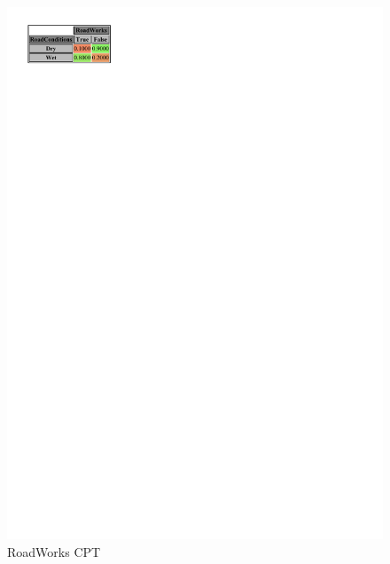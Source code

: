 \documentclass[a4paper,12pt]{article} %
\begin{document}
\begin{figure}[htb]
\begin{minipage}[c]{.5\textwidth}
		\includegraphics[width=\linewidth]{../code/roadworks.pdf}	
		\caption{RoadWorks CPT}
		\label{fig:roadworks}
	\end{minipage}
\end{figure}
\end{document}
